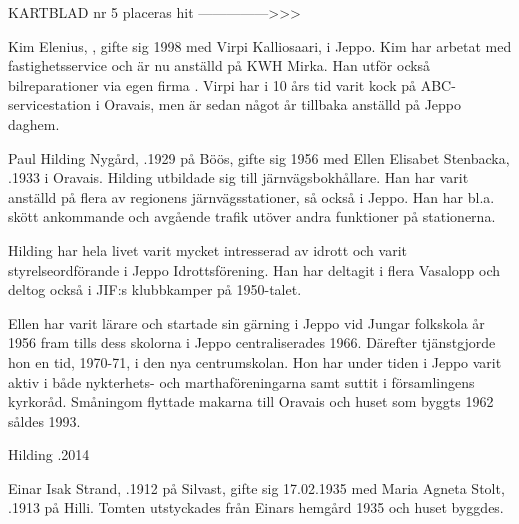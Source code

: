 

KARTBLAD nr 5 placeras hit --------------->>>




Kim Elenius, , gifte sig 1998 med Virpi Kalliosaari,  i Jeppo. Kim har arbetat med fastighetsservice och är nu anställd på KWH Mirka.  Han utför också bilreparationer via egen firma . Virpi har i 10 års tid varit kock på ABC-servicestation i Oravais, men är sedan något år tillbaka anställd på Jeppo daghem.
\begin{jhchildren}
  \item {}
  \item {}
\end{jhchildren}


Paul Hilding Nygård, .1929 på Böös, gifte sig 1956 med Ellen Elisabet Stenbacka, .1933 i Oravais. Hilding utbildade sig till järnvägsbokhållare. Han har varit anställd på flera av regionens järnvägsstationer, så också i Jeppo. Han har bl.a. skött ankommande och avgående trafik utöver andra  funktioner på stationerna.

Hilding har hela livet varit mycket intresserad av idrott och varit styrelseordförande i Jeppo Idrottsförening. Han har deltagit i flera Vasalopp och deltog också i JIF:s klubbkamper på 1950-talet.

Ellen har varit lärare och startade sin gärning i Jeppo vid Jungar folkskola år 1956 fram tills dess skolorna i Jeppo centraliserades 1966. Därefter tjänstgjorde hon en tid, 1970-71, i den nya centrumskolan. Hon har under tiden i Jeppo varit aktiv i både nykterhets- och marthaföreningarna samt suttit i församlingens kyrkoråd. Småningom flyttade makarna till Oravais och huset som byggts 1962 såldes 1993.

Hilding .2014




Einar Isak Strand, .1912 på Silvast, gifte sig 17.02.1935 med Maria Agneta Stolt, .1913 på Hilli. Tomten utstyckades från Einars hemgård 1935 och huset byggdes.

